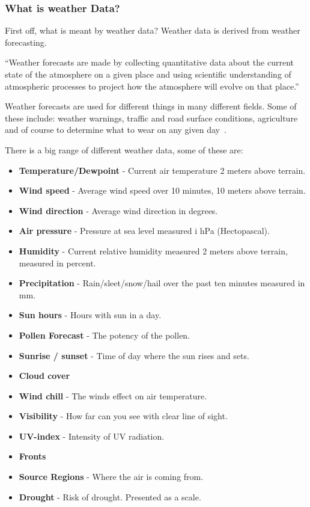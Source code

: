 \subsubsection{What is weather Data?} %
\label{ssub:what_is_weather_data_}
First off, what is meant by weather data? Weather data is derived from weather forecasting. 

\enquote{Weather forecasts are made by collecting quantitative data about the current state of the atmosphere on a given place and using scientific understanding of atmospheric processes to project how the atmosphere will evolve on that place.}~\cite*{Wiki2014-1}

Weather forecasts are used for different things in many different fields. Some of these include: weather warnings, traffic and road surface conditions, agriculture and of course to determine what to wear on any given day~\cite*{Wiki2014-1}.

There is a big range of different weather data, some of these are:

\begin{itemize}
     \item \textbf{Temperature/Dewpoint} - Current air temperature 2 meters above terrain.
     \item \textbf{Wind speed} - Average wind speed over 10 minutes, 10 meters above terrain.
     \item \textbf{Wind direction} - Average wind direction in degrees.
     \item \textbf{Air pressure} - Pressure at sea level measured i hPa (Hectopascal).
     \item \textbf{Humidity} - Current relative humidity measured 2 meters above terrain, measured in percent.
     \item \textbf{Precipitation} - Rain/sleet/snow/hail over the past ten minutes measured in mm.
     \item \textbf{Sun hours} - Hours with sun in a day.
     \item \textbf{Pollen Forecast} - The potency of the pollen. 
     \item \textbf{Sunrise / sunset} - Time of day where the sun rises and sets.
     \item \textbf{Cloud cover}
     \item \textbf{Wind chill} - The winds effect on air temperature.
     \item \textbf{Visibility} - How far can you see with clear line of sight.
     \item \textbf{UV-index} - Intensity of UV radiation.
     \item \textbf{Fronts} 
     \item \textbf{Source Regions} - Where the air is coming from.
     \item \textbf{Drought} - Risk of drought. Presented as a scale.
 \end{itemize}

